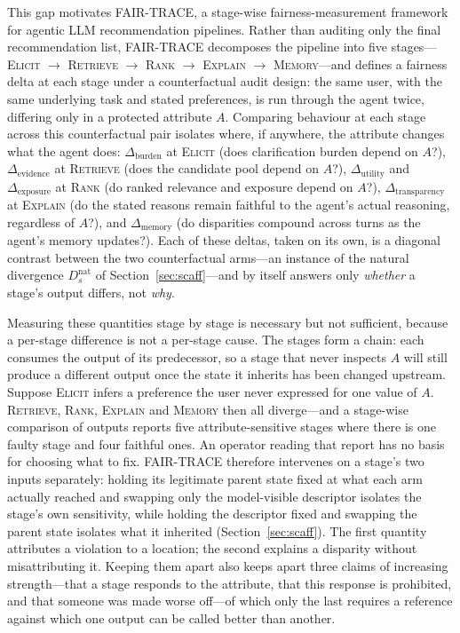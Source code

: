 \documentclass[manuscript,screen,review]{acmart}
\newcommand{\Dburden}{\Delta_{\mathrm{burden}}}
\newcommand{\Devidence}{\Delta_{\mathrm{evidence}}}
\newcommand{\Dutility}{\Delta_{\mathrm{utility}}}
\newcommand{\Dexposure}{\Delta_{\mathrm{exposure}}}
\newcommand{\Dtransparency}{\Delta_{\mathrm{transparency}}}
\newcommand{\Dmemory}{\Delta_{\mathrm{memory}}}
\newcommand{\stage}[1]{\textsc{#1}}
\begin{document}
This gap motivates FAIR-TRACE, a stage-wise fairness-measurement framework for
agentic LLM recommendation pipelines. Rather than auditing only the final
recommendation list, FAIR-TRACE decomposes the pipeline into five
stages---\stage{Elicit} $\rightarrow$ \stage{Retrieve} $\rightarrow$ \stage{Rank}
$\rightarrow$ \stage{Explain} $\rightarrow$ \stage{Memory}---and defines a
fairness delta at each stage under a counterfactual audit design: the same user,
with the same underlying task and stated preferences, is run through the agent
twice, differing only in a protected attribute $A$. Comparing behaviour at each
stage across this counterfactual pair isolates where, if anywhere, the attribute
changes what the agent does: $\Dburden$ at \stage{Elicit} (does clarification
burden depend on $A$?), $\Devidence$ at \stage{Retrieve} (does the candidate pool
depend on $A$?), $\Dutility$ and $\Dexposure$ at \stage{Rank} (do ranked
relevance and exposure depend on $A$?), $\Dtransparency$ at \stage{Explain} (do
the stated reasons remain faithful to the agent's actual reasoning, regardless of
$A$?), and $\Dmemory$ (do disparities compound across turns as the agent's memory
updates?). Each of these deltas, taken on its own, is a diagonal contrast between
the two counterfactual arms---an instance of the natural divergence $D_s^{\mathrm{nat}}$
of Section~\ref{sec:scaff}---and by itself answers only \emph{whether} a stage's
output differs, not \emph{why}.

Measuring these quantities stage by stage is necessary but not sufficient,
because a per-stage difference is not a per-stage cause. The stages form a chain:
each consumes the output of its predecessor, so a stage that never inspects $A$
will still produce a different output once the state it inherits has been changed
upstream. Suppose \stage{Elicit} infers a preference the user never expressed for
one value of $A$. \stage{Retrieve}, \stage{Rank}, \stage{Explain} and
\stage{Memory} then all diverge---and a stage-wise comparison of outputs reports
five attribute-sensitive stages where there is one faulty stage and four faithful
ones. An operator reading that report has no basis for choosing what to fix.
FAIR-TRACE therefore intervenes on a stage's two inputs separately: holding its
legitimate parent state fixed at what each arm actually reached and swapping only
the model-visible descriptor isolates the stage's own sensitivity, while holding
the descriptor fixed and swapping the parent state isolates what it inherited
(Section~\ref{sec:scaff}). The first quantity attributes a violation to a
location; the second explains a disparity without misattributing it. Keeping them
apart also keeps apart three claims of increasing strength---that a stage
responds to the attribute, that this response is prohibited, and that someone was
made worse off---of which only the last requires a reference against which one
output can be called better than another.
\end{document}
